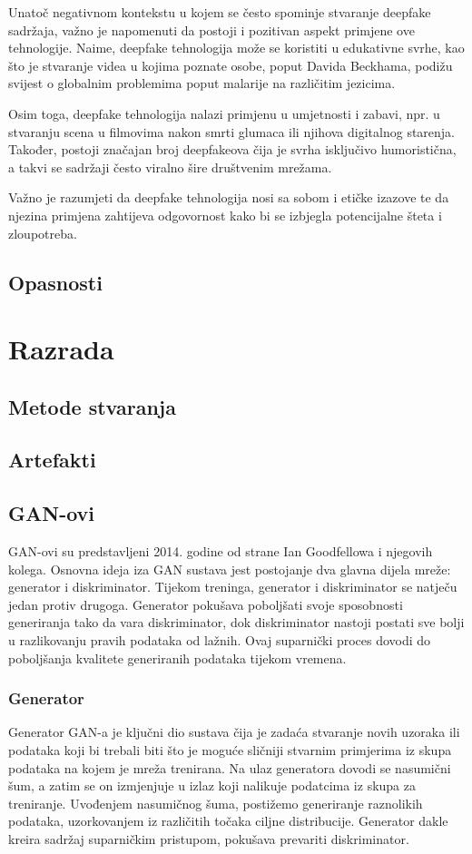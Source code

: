 \documentclass[seminarski, times, utf8]{fer}
\begin{document}
Unatoč negativnom kontekstu u kojem se često spominje stvaranje deepfake sadržaja, važno je napomenuti da postoji i pozitivan aspekt primjene ove tehnologije. Naime, deepfake tehnologija može se koristiti u edukativne svrhe, kao što je stvaranje videa u kojima poznate osobe, poput Davida Beckhama, podižu svijest o globalnim problemima poput malarije na različitim jezicima.

Osim toga, deepfake tehnologija nalazi primjenu u umjetnosti i zabavi, npr. u stvaranju scena u filmovima nakon smrti glumaca ili njihova digitalnog starenja. Također, postoji značajan broj deepfakeova čija je svrha isključivo humoristična, a takvi se sadržaji često viralno šire društvenim mrežama.

Važno je razumjeti da deepfake tehnologija nosi sa sobom i etičke izazove te da njezina primjena zahtijeva odgovornost kako bi se izbjegla potencijalne šteta i zloupotreba.
\section{Opasnosti}


\chapter{Razrada}
\section{Metode stvaranja}
\section{Artefakti}
\section{GAN-ovi}
GAN-ovi su predstavljeni 2014. godine od strane Ian Goodfellowa i njegovih kolega.
Osnovna ideja iza GAN sustava jest postojanje dva glavna dijela mreže: generator i diskriminator.
Tijekom treninga, generator i diskriminator se natječu jedan protiv drugoga. Generator pokušava poboljšati svoje sposobnosti generiranja tako da vara diskriminator, dok diskriminator nastoji postati sve bolji u razlikovanju pravih podataka od lažnih. Ovaj suparnički proces dovodi do poboljšanja kvalitete generiranih podataka tijekom vremena.
\subsection{Generator}
Generator GAN-a je ključni dio sustava čija je zadaća stvaranje novih uzoraka ili podataka koji bi trebali biti što je moguće sličniji stvarnim primjerima iz skupa podataka na kojem je mreža trenirana. 
Na ulaz generatora dovodi se nasumični šum, a zatim se on izmjenjuje u izlaz koji nalikuje podatcima iz skupa za treniranje. Uvođenjem nasumičnog šuma, postižemo generiranje raznolikih podataka, uzorkovanjem iz različitih točaka ciljne distribucije.
Generator dakle kreira sadržaj suparničkim pristupom, pokušava prevariti diskriminator.
\end{document}

